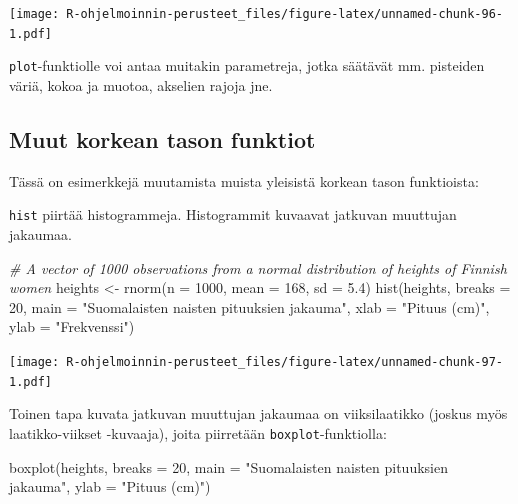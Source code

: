 \documentclass[
]{book}
\newenvironment{Shaded}{\begin{snugshade}}{\end{snugshade}}
\newcommand{\AttributeTok}[1]{\textcolor[rgb]{0.77,0.63,0.00}{#1}}
\newcommand{\CommentTok}[1]{\textcolor[rgb]{0.56,0.35,0.01}{\textit{#1}}}
\newcommand{\DecValTok}[1]{\textcolor[rgb]{0.00,0.00,0.81}{#1}}
\newcommand{\FloatTok}[1]{\textcolor[rgb]{0.00,0.00,0.81}{#1}}
\newcommand{\FunctionTok}[1]{\textcolor[rgb]{0.00,0.00,0.00}{#1}}
\newcommand{\NormalTok}[1]{#1}
\newcommand{\OtherTok}[1]{\textcolor[rgb]{0.56,0.35,0.01}{#1}}
\newcommand{\StringTok}[1]{\textcolor[rgb]{0.31,0.60,0.02}{#1}}
\begin{document}
\texttt{[image: R-ohjelmoinnin-perusteet\_files/figure-latex/unnamed-chunk-96-1.pdf]}

\texttt{plot}-funktiolle voi antaa muitakin parametreja, jotka säätävät mm. pisteiden väriä, kokoa ja muotoa, akselien rajoja jne.

\hypertarget{muut-korkean-tason-funktiot}{%
\subsection{Muut korkean tason funktiot}\label{muut-korkean-tason-funktiot}}

Tässä on esimerkkejä muutamista muista yleisistä korkean tason funktioista:

\texttt{hist} piirtää histogrammeja. Histogrammit kuvaavat jatkuvan muuttujan jakaumaa.

\begin{Shaded}
\begin{Highlighting}[]
\CommentTok{\# A vector of 1000 observations from a normal distribution of heights of Finnish women}
\NormalTok{heights }\OtherTok{\textless{}{-}} \FunctionTok{rnorm}\NormalTok{(}\AttributeTok{n =} \DecValTok{1000}\NormalTok{, }\AttributeTok{mean =} \DecValTok{168}\NormalTok{, }\AttributeTok{sd =} \FloatTok{5.4}\NormalTok{)}
\FunctionTok{hist}\NormalTok{(heights, }\AttributeTok{breaks =} \DecValTok{20}\NormalTok{, }
     \AttributeTok{main =} \StringTok{"Suomalaisten naisten pituuksien jakauma"}\NormalTok{,}
     \AttributeTok{xlab =} \StringTok{"Pituus (cm)"}\NormalTok{, }\AttributeTok{ylab =} \StringTok{"Frekvenssi"}\NormalTok{)}
\end{Highlighting}
\end{Shaded}

\texttt{[image: R-ohjelmoinnin-perusteet\_files/figure-latex/unnamed-chunk-97-1.pdf]}

Toinen tapa kuvata jatkuvan muuttujan jakaumaa on viiksilaatikko (joskus myös laatikko-viikset -kuvaaja), joita piirretään \texttt{boxplot}-funktiolla:

\begin{Shaded}
\begin{Highlighting}[]
\FunctionTok{boxplot}\NormalTok{(heights, }\AttributeTok{breaks =} \DecValTok{20}\NormalTok{, }
     \AttributeTok{main =} \StringTok{"Suomalaisten naisten pituuksien jakauma"}\NormalTok{,}
     \AttributeTok{ylab =} \StringTok{"Pituus (cm)"}\NormalTok{)}
\end{Highlighting}
\end{Shaded}
\end{document}
